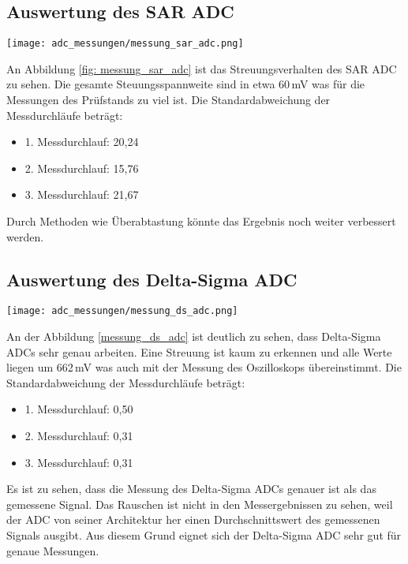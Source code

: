\subsection{Auswertung des SAR ADC}

\begin{figure*}[h]
	\centering
	\texttt{[image: adc\_messungen/messung\_sar\_adc.png]}
	\caption{Messdurchlauf SAR ADC}
	\label{fig: messung_sar_adc}
\end{figure*}
\noindent
An Abbildung \ref{fig: messung_sar_adc} ist das Streuungsverhalten des SAR ADC zu sehen. Die gesamte Steuungsspannweite sind in etwa 60\,mV was für die Messungen des Prüfstands zu viel ist. Die Standardabweichung der Messdurchläufe beträgt:
\begin{itemize}
\itemsep0em
\item 1. Messdurchlauf: 20,24
\item 2. Messdurchlauf: 15,76
\item 3. Messdurchlauf: 21,67
\end{itemize}
Durch Methoden wie Überabtastung könnte das Ergebnis noch weiter verbessert werden.

\subsection{Auswertung des Delta-Sigma ADC}

\begin{figure*}[h]
	\centering
	\texttt{[image: adc\_messungen/messung\_ds\_adc.png]}
	\caption{Messdurchlauf Delta-Sigma ADC}
	\label{messung_ds_adc}
\end{figure*}
\noindent
An der Abbildung \ref{messung_ds_adc} ist deutlich zu sehen, dass Delta-Sigma ADCs sehr genau arbeiten. Eine Streuung ist kaum zu erkennen und alle Werte liegen um 662\,mV was auch mit der Messung des Oszilloskops übereinstimmt. Die Standardabweichung der Messdurchläufe beträgt:
\begin{itemize}
\itemsep0em
\item 1. Messdurchlauf: 0,50
\item 2. Messdurchlauf: 0,31
\item 3. Messdurchlauf: 0,31
\end{itemize}
\noindent
Es ist zu sehen, dass die Messung des Delta-Sigma ADCs genauer ist als das gemessene Signal. Das Rauschen ist nicht in den Messergebnissen zu sehen, weil der ADC von seiner Architektur her einen Durchschnittswert des gemessenen Signals ausgibt. Aus diesem Grund eignet sich der Delta-Sigma ADC sehr gut für genaue Messungen. 

